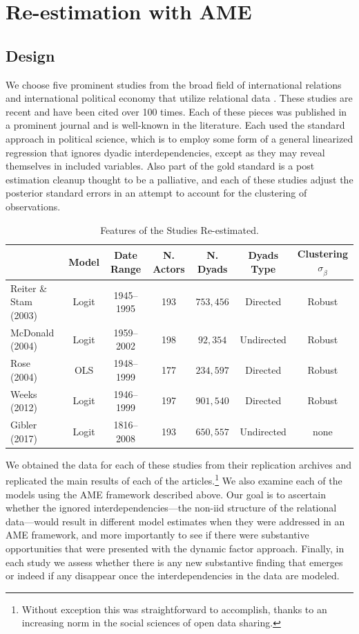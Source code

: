 \section{Re-estimation with AME}
 
\subsection{Design}

We choose five prominent studies from the broad field of international relations and international political economy that utilize relational data \citep{reiter:stam:2003, mcdonald:2004,  rose:2004, weeks:2012, gibler:2017}. These studies are recent and have been cited over 100 times. Each of these pieces was published in a prominent journal and is well-known in the literature. Each used the standard approach in political science, which is to employ some form of a general linearized regression that ignores dyadic interdependencies, except as they may reveal themselves in included variables. Also part of the gold standard is a post estimation cleanup thought to be a palliative, and each of these studies adjust the posterior standard errors in an attempt to account for the clustering of observations.

\begin{table}
\caption{Features of the Studies Re-estimated. }
	\begin{tabular}{lcccccc}
		& Model &  Date Range & N. Actors  & N. Dyads & Dyads Type & Clustering $\sigma_{\hat{\beta}}$ \\ \toprule
		Reiter \& Stam (2003) &Logit &1945--1995 &  193 & $753,456$ & Directed & Robust \\	
		McDonald (2004) & Logit &1959--2002 & 198 & $92,354$ & Undirected & Robust\\
		Rose (2004) & OLS & 1948--1999 & 177 & $234,597$ & Directed & Robust \\	 
		Weeks (2012) & Logit & 1946--1999 &197 &  $901,540$ & Directed & Robust \\
		Gibler (2017) & Logit & 1816--2008 &193 &   $650,557$ & Undirected & none \\ \bottomrule
	\end{tabular}
\end{table}

We obtained the data for each of these studies from their replication archives and replicated the main results of each of the articles.\footnote{Without exception this was straightforward to accomplish, thanks to an increasing norm in the social sciences of open data sharing.} We also examine each of the models using the AME framework described above.  Our goal is to ascertain whether the ignored interdependencies---the non-iid structure of the relational data---would result in different model estimates when they were addressed in an AME framework, and more importantly to see if there were substantive opportunities that were presented with the dynamic factor approach.  
Finally, in each study we assess whether there is any new substantive finding that emerges or indeed if any disappear once the interdependencies in the data are modeled.

